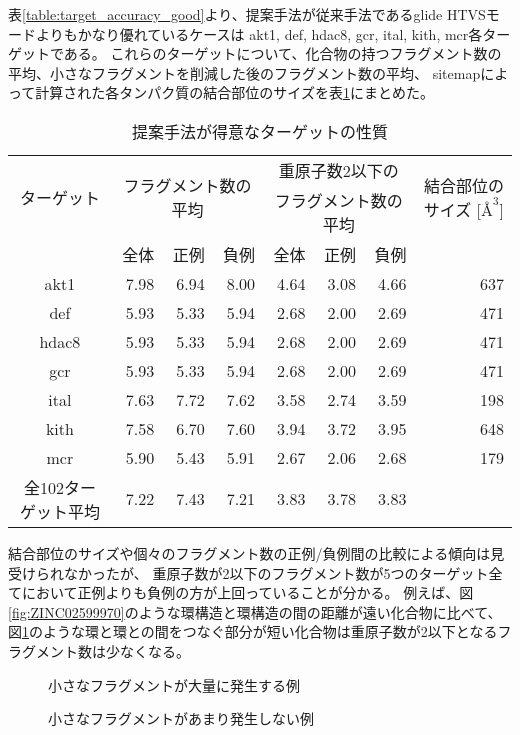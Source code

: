 表\ref{table:target_accuracy_good}より、提案手法が従来手法であるglide HTVSモードよりもかなり優れているケースは
akt1, def, hdac8, gcr, ital, kith, mcr各ターゲットである。
これらのターゲットについて、化合物の持つフラグメント数の平均、小さなフラグメントを削減した後のフラグメント数の平均、
sitemapによって計算された各タンパク質の結合部位のサイズを表\ref{table:good_property}にまとめた。
\begin{table}[htb] \centering
	\caption{提案手法が得意なターゲットの性質}
	\label{table:good_property}
	\begin{tabular}{c|rrrrrrr}
	\hline
	\multirow{2}{*}{ターゲット}	&\multicolumn{3}{c}{\multirow{2}{*}{フラグメント数の平均}}	&\multicolumn{3}{c}{重原子数2以下の}		&\multirow{2}{*}{結合部位のサイズ [$Å^3$]}	\\
							&		&		&								&\multicolumn{3}{c}{フラグメント数の平均}	&										\\
							&全体	&正例	&負例							&全体	&正例		&負例			&										\\ \hline
	akt1						&7.98	&6.94	&8.00							&4.64	&3.08		&4.66			&637									\\
	def						&5.93	&5.33	&5.94							&2.68	&2.00		&2.69			&471									\\
	hdac8					&5.93	&5.33	&5.94							&2.68	&2.00		&2.69			&471									\\
	gcr						&5.93	&5.33	&5.94							&2.68	&2.00		&2.69			&471									\\
	ital						&7.63	&7.72	&7.62							&3.58	&2.74		&3.59			&198									\\
	kith						&7.58	&6.70	&7.60							&3.94	&3.72		&3.95			&648									\\
	mcr						&5.90	&5.43	&5.91							&2.67	&2.06		&2.68			&179									\\ \hline
	全102ターゲット平均		&7.22	&7.43	&7.21							&3.83	&3.78		&3.83			&\todo{算出}								\\ \hline
	\end{tabular}
\end{table}
結合部位のサイズや個々のフラグメント数の正例/負例間の比較による傾向は見受けられなかったが、
重原子数が2以下のフラグメント数が5つのターゲット全てにおいて正例よりも負例の方が上回っていることが分かる。
例えば、図\ref{fig:ZINC02599970}のような環構造と環構造の間の距離が遠い化合物に比べて、
図\ref{fig:ZINC03782818}のような環と環との間をつなぐ部分が短い化合物は重原子数が2以下となるフラグメント数は少なくなる。
\begin{figure}[b]
\begin{minipage}{0.5\hsize}
 \begin{center}
  \caption{小さなフラグメントが大量に発生する例}
  \label{fig:ZINC02599970}
 \end{center}
\end{minipage}
\begin{minipage}{0.5\hsize}
 \begin{center}
  \caption{小さなフラグメントがあまり発生しない例}
  \label{fig:ZINC03782818}
 \end{center}
\end{minipage}
\end{figure}
